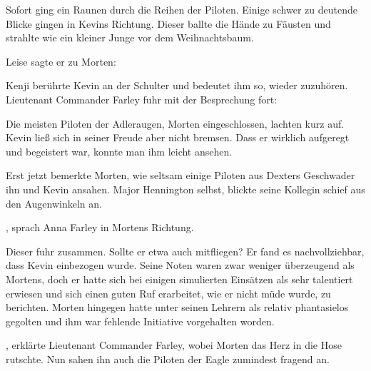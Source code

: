 \par

Sofort ging ein Raunen durch die Reihen der Piloten. Einige schwer zu deutende Blicke gingen in Kevins Richtung. Dieser ballte die Hände zu Fäusten und strahlte wie ein kleiner Junge vor dem Weihnachtsbaum.

\par

Leise sagte er zu Morten: 

\par

Kenji berührte Kevin an der Schulter und bedeutet ihm so, wieder zuzuhören. Lieutenant Commander Farley fuhr mit der Besprechung fort: 

\par

Die meisten Piloten der Adleraugen, Morten eingeschlossen, lachten kurz auf. Kevin ließ sich in seiner Freude aber nicht bremsen. Dass er wirklich aufgeregt und begeistert war, konnte man ihm leicht ansehen.

\par

Erst jetzt bemerkte Morten, wie seltsam einige Piloten aus Dexters Geschwader ihn und Kevin ansahen. Major Hennington selbst, blickte seine Kollegin schief aus den Augenwinkeln an.

\par

, sprach Anna Farley in Mortens Richtung.

\par

Dieser fuhr zusammen. Sollte er etwa auch mitfliegen? Er fand es nachvollziehbar, dass Kevin einbezogen wurde. Seine Noten waren zwar weniger überzeugend als Mortens, doch er hatte sich bei einigen simulierten Einsätzen als sehr talentiert erwiesen und sich einen guten Ruf erarbeitet, wie er nicht müde wurde, zu berichten. Morten hingegen hatte unter seinen Lehrern als relativ phantasielos gegolten und ihm war fehlende Initiative vorgehalten worden.

\par

, erklärte Lieutenant Commander Farley, wobei Morten das Herz in die Hose rutschte. Nun sahen ihn auch die Piloten der Eagle zumindest fragend an. 


